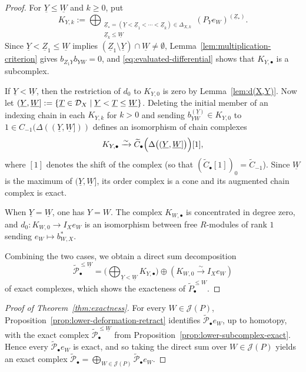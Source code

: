 \documentclass[a4paper,leqno]{amsart}
\begin{document}
\begin{proof}
For $\underline{Y}\leq \underline{W}$ and $k\geq0$, put
\[
 K_{Y,k}
 :=\bigoplus_{\substack{
 \underline{Z}_\ast=(\underline{Y}<\underline{Z}_1<\cdots<\underline{Z}_k)\in\Delta_{X,k}\\
 \underline{Z}_k\leq \underline{W}}}
 (P_Ye_W)^{(\underline{Z}_\ast)}.
\]
Since $\underline{Y}<\underline{Z}_1\leq \underline{W}$ implies $(\underline{Z}_1\setminus \underline{Y})\cap \underline{W}\neq\emptyset$, Lemma~\ref{lem:multiplication-criterion} gives $b_{Z_1Y}b_{YW}=0$, and \eqref{eq:evaluated-differential} shows that $K_{Y,\bullet}$ is a subcomplex.

If $\underline{Y}<\underline{W}$, then the restriction of $d_0$ to $K_{Y,0}$ is zero by Lemma~\ref{lem:d(X,Y)}.
Now let $(\underline{Y},\underline{W}]:=\{\underline{T}\in\mathcal D_X\mid \underline{Y}<\underline{T}\leq \underline{W}\}$. Deleting the initial member of an indexing chain in each $K_{Y,k}$ for $k>0$ and sending $b_{YW}^{(\underline{Y})} \in K_{Y,0}$ to $1\in C_{-1}(\Delta((\underline{Y},\underline{W}]))$ defines an isomorphism of chain complexes
\[
 K_{Y,\bullet}
 \xrightarrow{\sim}
 \widetilde C_\bullet
 \Bigl(\Delta\big((\underline{Y},\underline{W}]\big)\Bigr)[1],
\]  
where $[1]$ denotes the shift of the complex (so that $(\widetilde{C}_\bullet[1])_0 = \widetilde{C}_{-1}$).
Since $\underline{W}$ is the maximum of $(\underline{Y},\underline{W}]$, its order complex is a cone and its augmented chain complex is exact.

When $\underline{Y}=\underline{W}$, one has $Y=W$.  The complex $K_{W,\bullet}$ is concentrated in degree zero, and $d_0: K_{W,0}\longrightarrow I_Xe_W$ is an isomorphism between free $R$-modules of rank $1$ sending $e_W\mapsto b_{W,X}^*$.  

Combining the two cases, we obtain a direct sum decomposition
\[
 \widetilde{\mathcal P}_\bullet^{\leq \underline{W}}
 =\Big(\bigoplus_{\underline{Y}<\underline{W}}K_{Y,\bullet}\Big)
 \oplus\left(K_{W,0}\xrightarrow{\sim}I_Xe_W\right)
\]
of exact complexes, which shows the exacteness of $\widetilde{P}_\bullet^{\le W}$.
\end{proof}

\begin{proof}[Proof of Theorem~\ref{thm:exactness}]
For every $W\in\mathcal J(P)$, Proposition~\ref{prop:lower-deformation-retract} identifies $\widetilde{\mathcal P}_\bullet e_W$, up to homotopy, with the exact complex $\widetilde{\mathcal P}_\bullet^{\leq \underline{W}}$ from Proposition~\ref{prop:lower-subcomplex-exact}.  Hence every $\widetilde{\mathcal P}_\bullet e_W$ is exact, and so taking the direct sum over $W\in \mathcal{J}(P)$ yields an exact complex $\widetilde{\mathcal P}_\bullet =\bigoplus_{W\in\mathcal J(P)} \widetilde{\mathcal P}_\bullet e_W$.
\end{proof}
\endgroup
\end{document}
